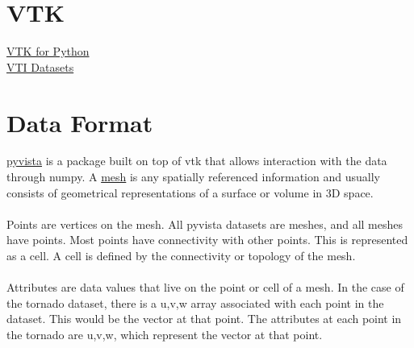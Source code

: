 \documentclass{article}
\begin{document}
\section*{VTK}
\href{https://kitware.github.io/vtk-examples/site/Python/}{VTK for Python}\\
\href{https://cgl.ethz.ch/research/visualization/data.php}{VTI Datasets}


\section*{Data Format}
\href{https://docs.pyvista.org/index.html}{pyvista} is a package built on top of vtk that allows interaction with the data through numpy. A \href{https://docs.pyvista.org/user-guide/what-is-a-mesh.html}{mesh} is any spatially referenced information and usually consists of geometrical representations of a surface or volume in 3D space.
\\\\
Points are vertices on the mesh. All pyvista datasets are meshes, and all meshes have points. Most points have connectivity with other points. This is represented as a cell. A cell is defined by the connectivity or topology of the mesh.
\\\\
Attributes are data values that live on the point or cell of a mesh. In the case of the tornado dataset, there is a u,v,w array associated with each point in the dataset. This would be the vector at that point. The attributes at each point in the tornado are u,v,w, which represent the vector at that point.








\end{document}
